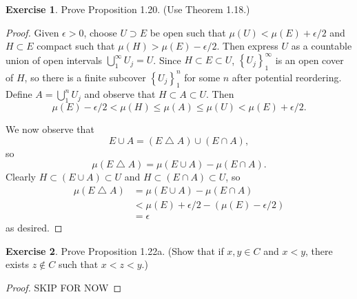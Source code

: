 \documentclass{article}
\theoremstyle{definition}
\newtheorem{ex}{Exercise}
\begin{document}
\begin{ex}
	Prove Proposition 1.20. (Use Theorem 1.18.)
\end{ex}
\begin{proof}
	Given $\epsilon > 0$, choose $U \supset E$ be open such that $\mu(U) < \mu(E) + \epsilon / 2$ and $H \subset E$ compact such that $\mu(H) > \mu(E) - \epsilon / 2$.
	Then express $U$ as a countable union of open intervals $\bigcup_1^\infty U_j = U$.
	Since $H \subset E \subset U$, $\left\lbrace U_j \right\rbrace_1^\infty$ is an open cover of $H$, so there is a finite subcover $\left\lbrace U_j \right\rbrace_1^n$ for some $n$ after potential reordering.
	Define $A = \bigcup_1^n U_j$ and observe that $H \subset A \subset U$.
	Then \begin{equation*}
		\mu(E) - \epsilon / 2 < \mu(H) \leq \mu(A) \leq \mu(U) < \mu(E) + \epsilon / 2.
	\end{equation*}

	We now observe that \begin{equation*}
		E \cup A = \left( E \bigtriangleup A \right) \cup \left( E \cap A \right),
	\end{equation*}
	so \begin{equation*}
		\mu\left( E \bigtriangleup A \right) = \mu \left( E \cup A \right) - \mu \left( E \cap A \right).
	\end{equation*}
	Clearly $H \subset \left( E \cup A \right) \subset U$ and $H \subset \left( E \cap A \right) \subset U$, so \begin{align*}
		\mu \left( E \bigtriangleup A \right) & = \mu \left( E \cup A \right) - \mu \left( E \cap A \right) \\
		                                      & < \mu(E) + \epsilon / 2 - (\mu(E) - \epsilon / 2)           \\
		                                      & = \epsilon
	\end{align*}
	as desired.
\end{proof}

\begin{ex}
	Prove Proposition 1.22a. (Show that if $x, y \in C$ and $x < y$, there exists $z \notin C$ such that $x < z < y$.)
\end{ex}
\begin{proof}
	SKIP FOR NOW
\end{proof}
\end{document}
